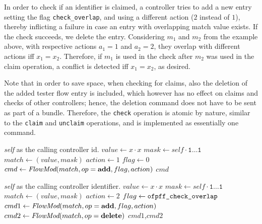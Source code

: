 \documentclass[conference]{sigcomm-alternate}
\newcommand{\concat}[0]{\cdot}
\newcommand{\claimcheck}{check\xspace}
\newcommand{\add}{\textbf{add}\xspace}
\newcommand{\dele}{\textbf{delete}\xspace}
\newcommand{\checko}{\texttt{check\_overlap}\xspace}
\begin{document}
In order to check if an identifier is claimed, a controller tries to add 
a new entry setting the flag \texttt{\checko}, and using a different
action ($2$ instead of $1$),
thereby inflicting a failure in case an entry with overlapping match value exists.
If the check succeeds, we delete the entry.
Considering $m_1$ and $m_2$ from the example above,
with respective actions $a_1=1$ and $a_2=2$,  they overlap
with different actions iff $x_1=x_2$. Therefore, if $m_1$ is used in the \claimcheck after $m_2$ was used in the claim operation,
a conflict is detected iff $x_1=x_2$, as desired.

Note that in order to save space, when checking for claims, also the deletion of the added tester flow entry is included,
which however has no effect on claims and checks of other controllers; hence, the deletion command does not
have to be sent as part of a bundle. Therefore, the \texttt{\claimcheck} operation is atomic by nature,
similar to the \texttt{claim} and \texttt{unclaim} operations, and is implemented as essentially one command.


\begin{algorithm}[t]
    \caption{$\textit{claim}(x)$}
    \label{alg:claim}
    \begin{algorithmic}[1]
    \Require \emph{self} as the calling controller id.
    		\State $value \gets x\concat x$
    		\State $mask \gets self\concat \texttt{1$\ldots$1}$
	    	\State $match \gets (value,mask)$
    		\State $action \gets 1$
    		\State $flag \gets 0$
    		\State $cmd\gets \emph{FlowMod}(match, op = \add, flag, action) $
			\Return $cmd$
    \end{algorithmic}
\end{algorithm}

\begin{algorithm}[t]
    \caption{$\textit{\claimcheck}(x)$}
    \label{alg:check}
    \begin{algorithmic}[1]
    \Require \emph{self} as the calling controller identifier.
    		\State $value \gets x\concat x$
    		\State $mask \gets self\concat \texttt{1$\ldots$1}$
    		\State $match \gets (value,mask)$
    		\State $action \gets 2$
    		\State $flag \gets \texttt{ofpff\_\checko}$
    		\State $cmd1\gets \emph{FlowMod}(match, op = \add, flag, action) $
    		\State $cmd2\gets \emph{FlowMod}(match, op = \dele) $
			\Return $cmd1$,$cmd2$
    \end{algorithmic}
\end{algorithm}
\end{document}
